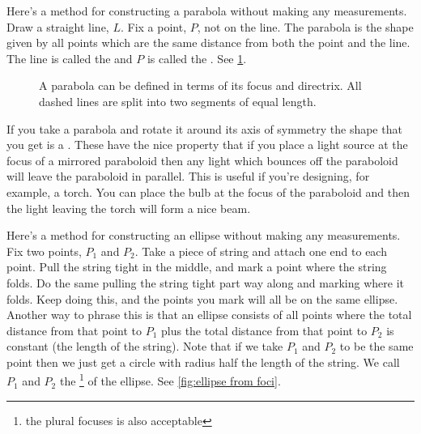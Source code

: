 \documentclass[fleqn]{LectureClass/LectureClass}
\begin{document}
    Here's a method for constructing a parabola without making any measurements.
    Draw a straight line, \(L\).
    Fix a point, \(P\), not on the line.
    The parabola is the shape given by all points which are the same distance from both the point and the line.
    The line is called the  and \(P\) is called the .
    See \cref{fig:parabola from focus}.
    
    \begin{figure}
        \centering
        \caption[Parabola from focus]{A parabola can be defined in terms of its focus and directrix. All dashed lines are split into two segments of equal length.}
        \label{fig:parabola from focus}
    \end{figure}
    
    \begin{app}{}{}
        If you take a parabola and rotate it around its axis of symmetry the shape that you get is a .
        These have the nice property that if you place a light source at the focus of a mirrored paraboloid then any light which bounces off the paraboloid will leave the paraboloid in parallel.
        This is useful if you're designing, for example, a torch.
        You can place the bulb at the focus of the paraboloid and then the light leaving the torch will form a nice beam.
    \end{app}
    
    Here's a method for constructing an ellipse without making any measurements.
    Fix two points, \(P_1\) and \(P_2\).
    Take a piece of string and attach one end to each point.
    Pull the string tight in the middle, and mark a point where the string folds.
    Do the same pulling the string tight part way along and marking where it folds.
    Keep doing this, and the points you mark will all be on the same ellipse.
    Another way to phrase this is that an ellipse consists of all points where the total distance from that point to \(P_1\) plus the total distance from that point to \(P_2\) is constant (the length of the string).
    Note that if we take \(P_1\) and \(P_2\) to be the same point then we just get a circle with radius half the length of the string.
    We call \(P_1\) and \(P_2\) the \footnote{the plural focuses is also acceptable} of the ellipse.
    See \cref{fig:ellipse from foci}.
    
\end{document}
